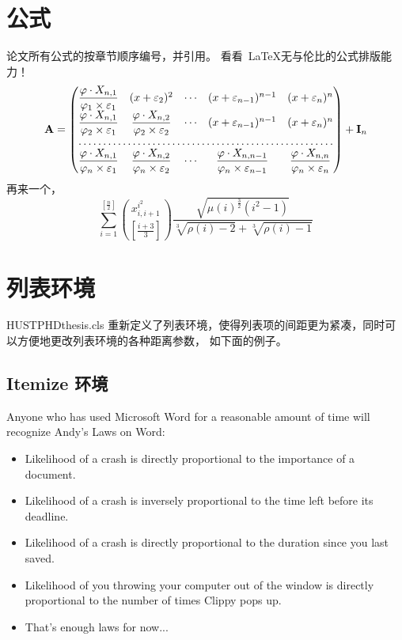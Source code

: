 \section{公式}
论文所有公式的按章节顺序编号，并引用。
看看~\LaTeX 无与伦比的公式排版能力！
\begin{equation}
\mathbf{A} =
\begin{pmatrix}
\dfrac{\varphi \cdot X_{n, 1}} {\varphi_{1} \times \varepsilon_{1}}
& (x + \varepsilon_{2})^{2} & \cdots & (x + \varepsilon_{n - 1})^{n
- 1}
& (x + \varepsilon_{n})^{n}\\
\dfrac{\varphi \cdot X_{n, 1}} {\varphi_{2} \times \varepsilon_{1}}
& \dfrac{\varphi \cdot X_{n, 2}} {\varphi_{2} \times
\varepsilon_{2}} & \cdots & (x + \varepsilon_{n - 1})^{n - 1}
& (x + \varepsilon_{n})^{n}\\
\hdotsfor{5}\\
\dfrac{\varphi \cdot X_{n, 1}} {\varphi_{n} \times \varepsilon_{1}}
& \dfrac{\varphi \cdot X_{n, 2}} {\varphi_{n} \times
\varepsilon_{2}} & \cdots & \dfrac{\varphi \cdot X_{n, n - 1}}
{\varphi_{n} \times \varepsilon_{n - 1}} & \dfrac{\varphi\cdot X_{n,
n}} {\varphi_{n} \times \varepsilon_{n}}
\end{pmatrix}
+ \mathbf{I}_{n}
\end{equation}
再来一个，
\begin{equation}
\sum_{i=1}^{\left[ \frac{n}{2}\right]} \binom{x_{i,i+1}^{i^2}}
{\left[\frac{i+3}{3} \right]} \frac{\sqrt{\mu(i)^{\frac{3}{2}}
(i^2-1)}} {\sqrt[3]{\rho(i)-2}+\sqrt[3]{\rho(i)-1}}
\end{equation}


\section{列表环境}

HUSTPHDthesis.cls
重新定义了列表环境，使得列表项的间距更为紧凑，同时可以方便地更改列表环境的各种距离参数，
如下面的例子。

\subsection{Itemize 环境}

Anyone who has used Microsoft Word for a reasonable amount of time
will recognize Andy's Laws on Word:
\begin{itemize}
\item Likelihood of a crash is directly proportional to the importance of a document.
\item Likelihood of a crash is inversely proportional to the time left before its deadline.
\item Likelihood of a crash is directly proportional to the duration since you last saved.
\item Likelihood of you throwing your computer out of the window is directly proportional
to the number of times Clippy pops up.
\item That's enough laws for now...
\end{itemize}

